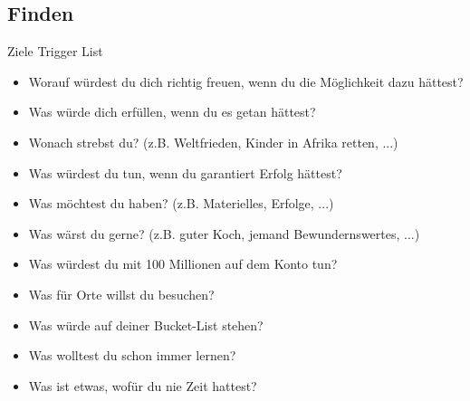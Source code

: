 \subsection{Finden}

\begin{frame}[c]{Ziele Trigger List}
    \footnotesize
    \begin{itemize}
        \item Worauf würdest du dich richtig freuen, wenn du die Möglichkeit dazu hättest?
        \item Was würde dich erfüllen, wenn du es getan hättest?
        \item Wonach strebst du? (z.B. Weltfrieden, Kinder in Afrika retten, ...)
        \item Was würdest du tun, wenn du garantiert Erfolg hättest?
        \item Was möchtest du haben? (z.B. Materielles, Erfolge, ...)
        \item Was wärst du gerne? (z.B. guter Koch, jemand Bewundernswertes, ...)
        \item Was würdest du mit 100 Millionen auf dem Konto tun?
        \item Was für Orte willst du besuchen?
        \item Was würde auf deiner Bucket-List stehen?
        \item Was wolltest du schon immer lernen?
        \item Was ist etwas, wofür du nie Zeit hattest?
    \end{itemize}
\end{frame}


